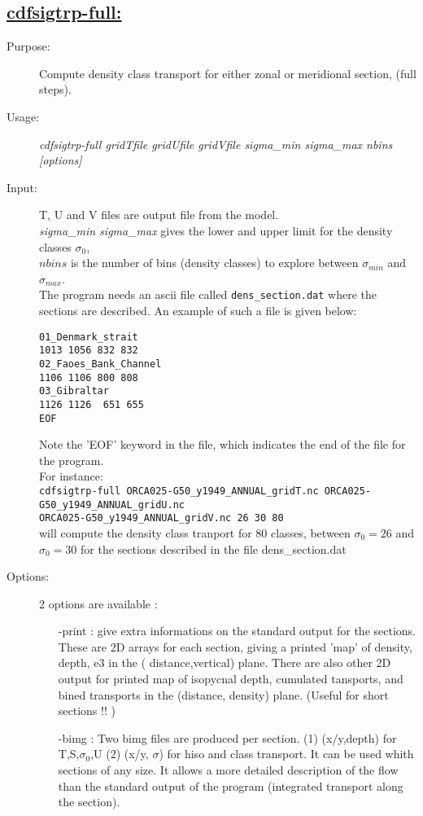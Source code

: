 \documentclass[a4paper,11pt]{article}
\begin{document}
\newpage
\subsection*{\underline{cdfsigtrp-full:}}
\begin{description}
\item[Purpose:] Compute density class transport for either zonal or meridional section, (full steps).
\item[Usage:] {\em cdfsigtrp-full gridTfile gridUfile gridVfile  sigma\_min sigma\_max nbins [options] }
\item[Input:] T, U and V files are output file from the model.\\
   {\em sigma\_min sigma\_max } gives the lower and upper limit for the density classes $\sigma_0$,\\
   $nbins$ is the number of bins (density classes) to explore between  $\sigma_{min}$ and $\sigma_{max}$. \\
The program needs an ascii file called {\tt dens\_section.dat} where the sections are described. An example of such a file is given below:
\begin{scriptsize}
\begin{verbatim}
01_Denmark_strait
1013 1056 832 832
02_Faoes_Bank_Channel
1106 1106 800 808
03_Gibraltar
1126 1126  651 655
EOF
\end{verbatim}
\end{scriptsize}
Note the 'EOF' keyword in the file, which indicates the end of the file for the program.\\
For instance: \\
{\tt cdfsigtrp-full ORCA025-G50\_y1949\_ANNUAL\_gridT.nc ORCA025-G50\_y1949\_ANNUAL\_gridU.nc \ \\
ORCA025-G50\_y1949\_ANNUAL\_gridV.nc 26 30 80} \\
will compute the density class tranport for 80 classes, between $\sigma_0=26$ and $\sigma_0=30$  for the sections described in the file dens\_section.dat
\item[Options:] 2 options are available :
   \begin{itemize}
	\item[-print] : give extra informations on the standard output for the sections.  These are 2D arrays for each section, giving
   a printed 'map' of density, depth, e3 in the ( distance,vertical) plane. There are also other 2D output for printed map of isopycnal
   depth, cumulated tansports, and bined transports in the (distance, density) plane. (Useful for short sections !! )
       \item[-bimg] : Two bimg files are produced per section. (1)  (x/y,depth) for T,S,$\sigma_0$,U (2) (x/y, $\sigma$) for   hiso and class transport.
        It can be used whith sections of any size. It allows a more detailed description of the flow than the standard output of the program
       (integrated transport along the section).
  \end{itemize}
              

\end{description}
\end{document}
